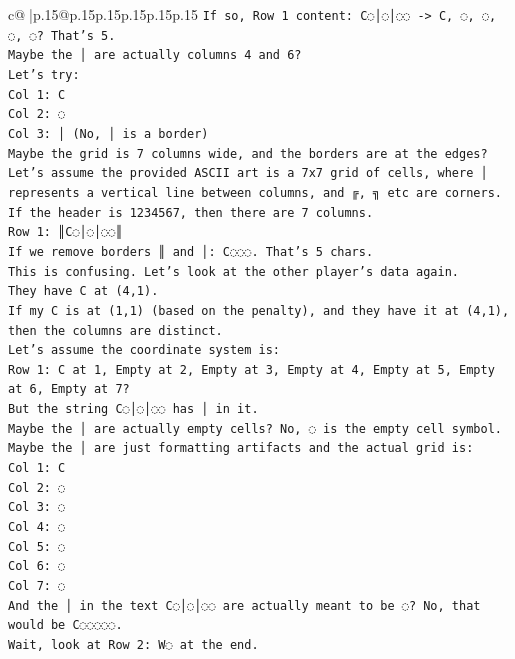 \documentclass{article}
\begin{document}
{\begin{supertabular}{c@{$\;$}|p{.15\linewidth}@{}p{.15\linewidth}p{.15\linewidth}p{.15\linewidth}p{.15\linewidth}p{.15\linewidth}}
{{{\texttt{If so, Row 1 content: C◌│◌│◌◌ {-}> C, ◌, ◌, ◌, ◌? That's 5.} \\
\texttt{Maybe the │ are actually columns 4 and 6?} \\
\texttt{Let's try:} \\
\texttt{Col 1: C} \\
\texttt{Col 2: ◌} \\
\texttt{Col 3: │ (No, │ is a border)} \\
\texttt{Maybe the grid is 7 columns wide, and the borders are at the edges?} \\
\texttt{Let's assume the provided ASCII art is a 7x7 grid of cells, where │ represents a vertical line between columns, and ╔, ╗ etc are corners.} \\
\texttt{If the header is 1234567, then there are 7 columns.} \\
\texttt{Row 1: ║C◌│◌│◌◌║} \\
\texttt{If we remove borders ║ and │: C◌◌◌. That's 5 chars.} \\
\texttt{This is confusing. Let's look at the other player's data again.} \\
\texttt{They have C at (4,1).} \\
\texttt{If my C is at (1,1) (based on the penalty), and they have it at (4,1), then the columns are distinct.} \\
\texttt{Let's assume the coordinate system is:} \\
\texttt{Row 1: C at 1, Empty at 2, Empty at 3, Empty at 4, Empty at 5, Empty at 6, Empty at 7?} \\
\texttt{But the string C◌│◌│◌◌ has │ in it.} \\
\texttt{Maybe the │ are actually empty cells? No, ◌ is the empty cell symbol.} \\
\texttt{Maybe the │ are just formatting artifacts and the actual grid is:} \\
\texttt{Col 1: C} \\
\texttt{Col 2: ◌} \\
\texttt{Col 3: ◌} \\
\texttt{Col 4: ◌} \\
\texttt{Col 5: ◌} \\
\texttt{Col 6: ◌} \\
\texttt{Col 7: ◌} \\
\texttt{And the │ in the text C◌│◌│◌◌ are actually meant to be ◌? No, that would be C◌◌◌◌◌.} \\
\texttt{Wait, look at Row 2: W◌ at the end.} \\
}}}
\end{supertabular}}
\end{document}
